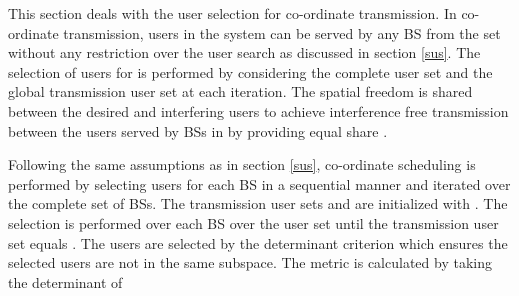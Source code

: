 
This section deals with the user selection for co-ordinate transmission. In co-ordinate transmission, users in the system  can be served by any BS from the set  without any restriction over the user search as discussed in section \ref{sus}. The selection of users for  is performed by considering the complete user set and the global transmission user set  at each iteration. The spatial freedom is shared between the desired and interfering users to achieve interference free transmission between the users served by BSs in  by providing equal share .

Following the same assumptions as in section \ref{sus}, co-ordinate scheduling is performed by selecting users for each BS in a sequential manner and iterated over the complete set of BSs. The transmission user sets  and  are initialized with \me{\emptyset}. The selection is performed over each BS  over the user set  until the transmission user set equals . The users are selected by the determinant criterion which ensures the selected users are not in the same subspace. The metric is calculated by taking the determinant of




